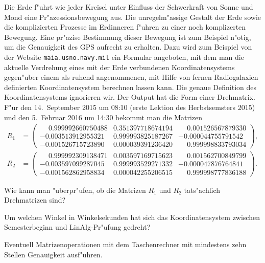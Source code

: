 Die Erde f"uhrt wie jeder Kreisel unter Einfluss der Schwerkraft von
Sonne und Mond eine Pr"azessionsbewegung aus.
Die unregelm"assige Gestalt der Erde sowie die komplizierten Prozesse
im Erdinneren f"uhren zu einer noch komplizerten Bewegung.
Eine pr"azise Bestimmung dieser Bewegung ist zum Beispiel n"otig, um
die Genauigkeit des GPS aufrecht zu erhalten.
Dazu wird zum Beispiel von der Website \texttt{maia.usno.navy.mil}
ein Formular angeboten, mit dem man die aktuelle Verdrehung eines
mit der Erde verbundenen Koordinatensystems gegen"uber einem als
ruhend angenommenen, mit Hilfe von fernen Radiogalaxien definierten
Koordinatensystem berechnen lassen kann.
Die genaue Definition des Koordinatensystems ignorieren wir.
Der Output hat die Form einer Drehmatrix.
F"ur den 14.~September 2015 um 08:10 (erste Lektion des Herbstsemsters 2015)
und den 5.~Februar 2016 um 14:30 bekommt man die Matrizen
\begin{align*}
R_1 &= \begin{pmatrix}
\phantom{-}0.999992660750488&0.351397718674194&\phantom{-}0.001526567879330\\
          -0.003513912955321&0.999993825187267&          -0.000044755791542\\
          -0.001526715723890&0.000039391236420&\phantom{-}0.999998833793034
\end{pmatrix},
\tag{2015-09-14 08:10}
\\
R_2 &= \begin{pmatrix}
\phantom{-}0.999992309138471&0.003597169715623&\phantom{-}0.001562700849799\\
          -0.003597099287045&0.999993529271332&          -0.000047876764841\\
          -0.001562862958834&0.000042255206515&\phantom{-}0.999998777836188
\end{pmatrix}.
\tag{2016-02-05 14:30}
\end{align*}
\begin{teilaufgaben}
\item
Wie kann man "uberpr"ufen, ob die Matrizen $R_1$ und $R_2$ tats"achlich
Drehmatrizen sind?
\item
Um welchen Winkel in Winkelsekunden hat sich das Koordinatensystem
zwischen Semesterbeginn und LinAlg-Pr"ufung gedreht?
\end{teilaufgaben}

\begin{hinweis}
Eventuell Matrizenoperationen mit dem Taschenrechner mit mindestens
zehn Stellen Genauigkeit ausf"uhren.
\end{hinweis}

